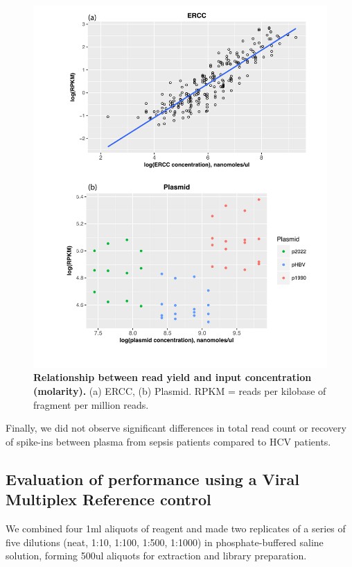 \begin{figure}[htbp]
\centering
\includegraphics[width=\textwidth]{./Results1/Images/1b_control_conc.pdf}
\caption[Relationship between read yield and input concentration]{\textbf{Relationship between read yield and input concentration (molarity).} (a) ERCC, (b) Plasmid. RPKM = reads per kilobase of fragment per million reads.}
\label{fig:1bcontrolconc}
\end{figure}


Finally, we did not observe significant differences in total read count or recovery of spike-ins between plasma from sepsis patients compared to HCV patients.




\subsection{Evaluation of performance using a Viral Multiplex Reference control}
We combined four 1ml aliquots of reagent and made two replicates of a series of five dilutions (neat, 1:10, 1:100, 1:500, 1:1000) in phosphate-buffered saline solution, forming 500ul aliquots for extraction and library preparation. 

